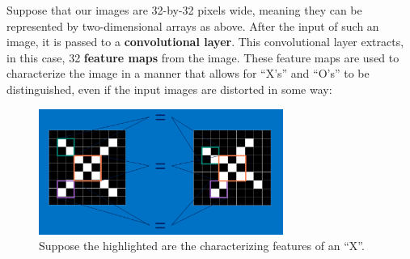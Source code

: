 \documentclass[a4paper, 11pt]{article} %
\begin{document}
 		Suppose that our images are 32-by-32 pixels wide, meaning they can be represented by
 		two-dimensional arrays as above. After the input of such an image, it is passed to a 
 		\textbf{convolutional layer}. This convolutional layer extracts, in this case, 32 \textbf{feature 
 		maps} from the image. 
 		These feature maps are used to characterize the image in a manner that allows for ``X's'' and 
 		``O's'' to be distinguished, even if the input images are distorted in some way:
 		\vskip 5mm
 		\begin{figure}[h]
 			\centering
 			\includegraphics[width=8cm]{figures/explan_3.png}
 			\caption{Suppose the highlighted are the characterizing features of an ``X''.}
 		\end{figure}
 
\end{document}
